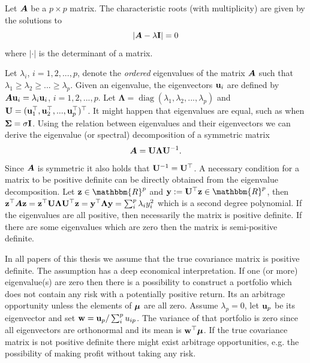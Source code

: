\documentclass[oneside]{book}\usepackage{knitr}
\begin{document}
\begin{definition}\label{def:eigenvalue} 
	Let $\mbox{\boldmath$A$}$ be a $p\times p$ matrix. The characteristic roots (with multiplicity) are given by the solutions to
	\begin{equation*}
		\left|\mbox{\boldmath$A$} - \lambda \mathbf{I}\right| = 0
	\end{equation*}
	where $|\cdot|$ is the determinant of a matrix.
\end{definition} 
Let $\lambda_i$, $i=1,2,...,p$, denote the \textit{ordered} eigenvalues of the matrix $\mbox{\boldmath$A$}$ such that $\lambda_1\geq \lambda_2 \geq ... \geq \lambda_p$.
Given an eigenvalue, the eigenvectors $\mathbf{u}_i$ are defined by $\mbox{\boldmath$A$} \mathbf{u}_i = \lambda_i \mathbf{u}_i$, $i=1,2,...,p$. 
Let $\boldsymbol{\Lambda} = \operatorname{diag}(\lambda_1, \lambda_2,...,\lambda_p)$ and $\mathbf{U}= (\mathbf{u}_1^\top, \mathbf{u}_2^\top, ..., \mathbf{u}_p^\top)^\top$. 
It might happen that eigenvalues are equal, such as when $\mathbf{\Sigma} = \sigma \mathbf{I}$.
Using the relation between eigenvalues and their eigenvectors we can derive the eigenvalue (or spectral) decomposition of a symmetric matrix 
\begin{equation}\label{eqn:eigenvalue_decomp}
	\mbox{\boldmath$A$} = \mathbf{U} \boldsymbol{\Lambda} \mathbf{U}^{-1}.
\end{equation}
Since $\mbox{\boldmath$A$}$ is symmetric it also holds that $\mathbf{U}^{-1} = \mathbf{U}^\top$.
A necessary condition for a matrix to be positive definite can be directly obtained from the eigenvalue decomposition. 
Let $\bz\in \mathbbm{R}^p$ and $\by := \bU^{\top} \bz \in \mathbbm{R}^p$, then $\mathbf{z}^\top \mbox{\boldmath$A$} \mathbf{z} = \mathbf{z}^\top \mathbf{U} \boldsymbol{\Lambda} \mathbf{U} ^{\top} \mathbf{z} = \mathbf{y}^\top \boldsymbol{\Lambda} \mathbf{y} = \sum_i^p \lambda_i y_i^2$ which is a second degree polynomial. 
If the eigenvalues are all positive, then necessarily the matrix is positive definite. 
If there are some eigenvalues which are zero then the matrix is semi-positive definite. 

In all papers of this thesis we assume that the true covariance matrix is positive definite. 
The assumption has a deep economical interpretation.
If one (or more) eigenvalue(s) are zero then there is a possibility to construct a portfolio which does not contain any risk with a potentially positive return. 
Its an arbitrage opportunity unless the elements of $\mbox{\boldmath$\mu$}$ are all zero.
Assume $\lambda_p=0$, let $\mathbf{u}_p$ be its eigenvector and set $\mathbf{w} = \mathbf{u}_p / \sum_i^p u_{ip}$. 
The variance of that portfolio is zero since all eigenvectors are orthonormal and its mean is $\mathbf{w}^\top \mbox{\boldmath$\mu$}$.
If the true covariance matrix is not positive definite there might exist arbitrage opportunities, e.g. the possibility of making profit without taking any risk.
\end{document}
